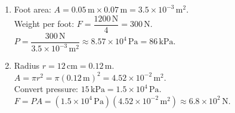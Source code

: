 \documentclass[12pt]{article}
\begin{document}
\begin{enumerate}
\item Foot area: \(A = 0.05\,\text{m} \times 0.07\,\text{m} = 3.5 \times 10^{-3}\,\text{m}^2.\)\\
Weight per foot: \(F = \dfrac{1200\,\text{N}}{4} = 300\,\text{N}.\)\\
\(P = \dfrac{300\,\text{N}}{3.5 \times 10^{-3}\,\text{m}^2} \approx 8.57 \times 10^{4}\,\text{Pa} = 86\,\text{kPa}.\)

\item Radius \(r = 12\,\text{cm} = 0.12\,\text{m}\).\\
\(A = \pi r^{2} = \pi(0.12\,\text{m})^{2} = 4.52 \times 10^{-2}\,\text{m}^2.\)\\
Convert pressure: \(15\,\text{kPa} = 1.5 \times 10^{4}\,\text{Pa}\).\\
\(F = P A = (1.5 \times 10^{4}\,\text{Pa})(4.52 \times 10^{-2}\,\text{m}^2) \approx 6.8 \times 10^{2}\,\text{N}.\)
\end{enumerate}
\end{document}
